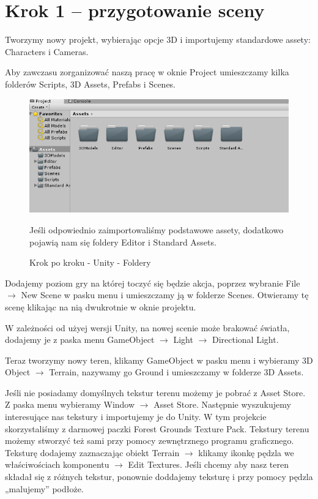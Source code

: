 \documentclass[brudnopis]{xmgr}
\begin{document}
\section{Krok 1 – przygotowanie sceny}


Tworzymy nowy projekt, wybierając opcje 3D i importujemy standardowe assety: Characters i Cameras.

Aby zawczasu zorganizować naszą pracę w oknie Project umieszczamy kilka folderów Scripts, 3D Assets, Prefabs  i Scenes.

\begin{figure}[!htb]
    \begin{center}
    \includegraphics[scale=0.25]{Screeny/UnityKrokPoKroku/foldery}
    \end{center}
    \caption{Krok po kroku - Unity - Foldery}
Jeśli odpowiednio zaimportowaliśmy podstawowe assety, dodatkowo pojawią nam się foldery Editor i Standard Assets.
\end{figure}

Dodajemy poziom gry na której toczyć się będzie akcja, poprzez wybranie File $\rightarrow$ New Scene w pasku menu i umieszczamy ją w folderze Scenes. Otwieramy tę scenę klikając na nią dwukrotnie w oknie projektu.

W zależności od użyej wersji Unity, na nowej scenie może brakować światła, dodajemy je z paska menu GameObject $\rightarrow$ Light $\rightarrow$ Directional Light.

Teraz tworzymy nowy teren, klikamy GameObject w pasku menu i wybieramy 3D Object $\rightarrow$ Terrain, nazywamy go Ground i umieszczamy w folderze 3D Assets.

Jeśli nie posiadamy domyślnych tekstur terenu możemy je pobrać z Asset Store. Z paska menu wybieramy Window $\rightarrow$ Asset Store. Następnie wyszukujemy interesujące nas tekstury i importujemy je do Unity. W tym projekcie skorzystaliśmy z darmowej paczki Forest Grounds Texture Pack. Tekstury terenu możemy stworzyć też sami przy pomocy zewnętrznego programu graficznego. Teksturę dodajemy zaznaczając obiekt Terrain $\rightarrow$ klikamy ikonkę pędzla we właściwościach komponentu $\rightarrow$ Edit Textures. Jeśli chcemy aby nasz teren składał się z różnych tekstur, ponownie doddajemy teksturę i przy pomocy pędzla „malujemy” podłoże.
\end{document}
